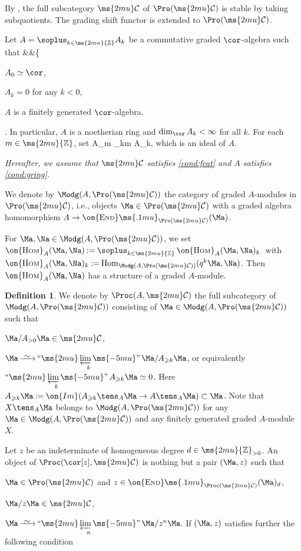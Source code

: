 \documentclass[12pt,leqno]{amsart}%
\renewcommand{\ge}{\geqslant}
\theoremstyle{plain}
\theoremstyle{definition}
\newtheorem{definition}[thm]{Definition}
\newcommand{\Z}{\ms{2mu}{\mathbb Z}}
\newcommand{\seteq}{\mathbin{:=}}
\newcommand{\Hom}{\operatorname{Hom}}
\newcommand{\HOM}{\on{\mathrm{H{\scriptstyle OM}}}}
\newcommand{\END}{\on{\mathrm{E\scriptstyle ND}}\ms{.1mu}}
\newcommand{\isoto}[1][]{\mathop{\xrightarrow%
[{\raisebox{.3ex}[0ex][.3ex]{$\scriptstyle{#1}$}}]%
{{\raisebox{-.6ex}[0ex][-.6ex]{$\mspace{5mu}\sim\mspace{5mu}$}}}}}
\renewcommand{\Im}{\on{Im}}
\newcommand{\bna}{\be[{\rm(a)}]}
\newcommand{\shc}{{\ms{2mu}\mathcal{C}}}
\newcounter{myc}
\newcommand{\proolim}[1][]{\mathop{\text{``}\ms{2mu}\varprojlim\ms{-5mu}\text{''}}\limits_{#1}}
\numberwithin{equation}{section}
\begin{document}
By \cite[Lemma 2.1]{ref}, 
the full subcategory $\shc$ of $\Pro(\shc)$ is stable by taking subquotients.
The grading shift functor is extended to $\Pro(\shc)$. 

Let $A=\soplus_{k\in \Z} A_k$ be a commutative graded $\cor$-algebra such that 
\eq&&\left\{
\parbox{70ex}{
\be[$\bullet$]
\item $A_0\simeq\cor$,
\item $A_k=0$ for any $k<0$,
\item $A$ is a finitely generated $\cor$-algebra.
\ee}\right.
\label{cond:gring}
\eneq
In particular, $A$ is a noetherian ring and $\dim_\cor A_k < \infty$ for all $k$.
For each $m\in \Z$, set
\eqn 
A_{\ge m} \seteq\soplus _{k\ge m} A_k, 
\eneqn
which is an ideal of $A$.

{\em Hereafter, we assume that
$\shc$ satisfies \eqref{cond:fcat} and $A$ satisfies \eqref{cond:gring}.}

We denote by $\Modg(A, \Pro(\shc))$ 
the category of graded $A$-modules in $\Pro(\shc)$,
i.e., objects $\Ma\in\Pro(\shc)$ with a graded algebra homomorphism
$A\to\END_{\Pro(\shc)}(\Ma)$.




 For $\Ma, \Na \in \Modg(A, \Pro(\shc))$, we set 
$\HOM_{A}(\Ma,\Na)\seteq\soplus_{k\in \Z} \, \HOM_A(\Ma,\Na)_k  \, $ with
$\HOM_{A}(\Ma,\Na)_k\seteq\Hom_{\Modg(A, \Pro(\shc))}(q^k \Ma,\Na)$.   
Then
$\HOM_A(\Ma,\Na)$ has a structure of a graded $A$-module.   

\begin{definition} \label{Def: Pro_coh}
We denote by $\Proc(A,\shc)$ the full subcategory of $\Modg(A, \Pro(\shc))$ consisting of $\Ma\in\Modg(A, \Pro(\shc))$ such that
\be[(a)]
\item $\Ma/A_{>0}\Ma \in \shc$,
\item $\Ma \isoto \proolim[k] \Ma / A_{\ge k} \Ma$, or equivalently $\proolim[k] A_{\ge k}\Ma  \simeq 0$.
\ee
Here $A_{\ge k}\Ma  \seteq \Im(A_{\ge k} \tens_A \Ma \to A \tens_A \Ma  ) \subset \Ma$. 
Note that $ X \tens_A  \Ma $ belongs to $\Modg(A, \Pro(\shc))$ for any 
$\Ma\in\Modg(A, \Pro(\shc))$ and any finitely generated graded $A$-module $X$.
\end{definition}

\Def \label{Def: affine objects}
Let $z$ be an indeterminate of homogeneous degree $d\in\Z_{>0}$.
An object
of $\Proc(\cor[z],\shc)$ is nothing but a pair $(\Ma,z)$ such that
\bna
\item $\Ma\in\Pro(\shc)$ and $z\in\END_{\Proc(\shc) }(\Ma)_d$,
\item $\Ma/z\Ma\in\shc$,
\item $\Ma\isoto\proolim[n]\Ma/z^{n}\Ma$.
\setcounter{myc}{\value{enumi}}
\ee
If $(\Ma,z)$ satisfies further the following condition
\end{document}

